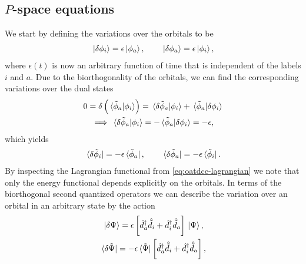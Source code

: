         \subsection{$P$-space equations}
            We start by defining the variations over the orbitals to be
            \begin{align}
                \ket*{\delta\phi_i} = \epsilon\ket*{\phi_a},
                \qquad
                \ket*{\delta\phi_a} = \epsilon\ket*{\phi_i},
            \end{align}
            where $\epsilon(t)$ is now an arbitrary function of time that is
            independent of the labels $i$ and $a$.
            Due to the biorthogonality of the orbitals, we can find the
            corresponding variations over the dual states
            \begin{gather}
                0 = \delta\left( \braket*{\tilde{\phi}_a}{\phi_i} \right)
                = \braket*{\delta\tilde{\phi}_a}{\phi_i}
                + \braket*{\tilde{\phi}_a}{\delta\phi_i}
                \\
                \implies
                \braket*{\delta\tilde{\phi}_a}{\phi_i}
                = -\braket*{\tilde{\phi}_a}{\delta\phi_i}
                = -\epsilon,
            \end{gather}
            which yields
            \begin{gather}
                \bra*{\delta\tilde{\phi}_i}
                = -\epsilon\bra*{\tilde{\phi}_a},
                \qquad
                \bra*{\delta\tilde{\phi}_a}
                = -\epsilon\bra*{\tilde{\phi}_i}.
            \end{gather}
            By inspecting the Lagrangian functional from
            \autoref{eq:oatdcc-lagrangian} we note that only the energy
            functional depends explicitly on the orbitals.
            In terms of the biorthogonal second quantized operators we can
            describe the variation over an orbital in an arbitrary state by the
            action
            \begin{gather}
                \ket*{\delta\Psi}
                = \epsilon\left[ 
                    \hat{d}^{\dagger}_{a}\hat{\tilde{d}}_{i}
                    + \hat{d}^{\dagger}_{i}\hat{\tilde{d}}_{a}
                 \right]\ket*{\Psi},
                \\
                \bra*{\delta\tilde{\Psi}}
                = -\epsilon\bra*{\tilde{\Psi}}\left[ 
                    \hat{d}^{\dagger}_{a}\hat{\tilde{d}}_{i}
                    + \hat{d}^{\dagger}_{i}\hat{\tilde{d}}_{a}
                 \right],
            \end{gather}
